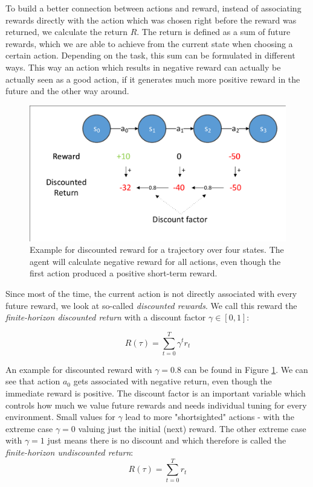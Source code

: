 To build a better connection between actions and reward, instead of associating rewards directly with the action which was chosen right before the reward was returned, we calculate the return $R$. The return is defined as a sum of future rewards, which we are able to achieve from the current state when choosing a certain action. Depending on the task, this sum can be formulated in different ways. This way an action which results in negative reward can actually be actually seen as a good action, if it generates much more positive reward in the future and the other way around.

\begin{figure}[ht]
  
  \begin{center}
      \includegraphics[trim=10px 10px 10px 10px, clip, width=0.75\columnwidth]{figures/rl/discounted_reward.pdf}
  \end{center}
  
  \caption[Discounted Reward Example]{Example for discounted reward for a trajectory over four states. The agent will calculate negative reward for all actions, even though the first action produced a positive short-term reward.}
  \label{fig:DiscountedReward}
\end{figure}

Since most of the time, the current action is not directly associated with every future reward, we look at so-called \textit{discounted rewards}. We call this reward the \textit{finite-horizon discounted return} with a discount factor $\gamma \in [0, 1]$:

\[R(\tau) = \sum_{t=0}^T \gamma^t r_t\]

An example for discounted reward with $\gamma = 0.8$ can be found in Figure \ref{fig:DiscountedReward}. We can see that action $a_0$ gets associated with negative return, even though the immediate reward is positive. The discount factor is an important variable which controls how much we value future rewards and needs individual tuning for every environment. Small values for $\gamma$ lead to more "shortsighted" actions - with the extreme case $\gamma = 0$ valuing just the initial (next) reward. The other extreme case with $\gamma = 1$ just means there is no discount and which therefore is called the \textit{finite-horizon undiscounted return}: 
\[R(\tau) = \sum_{t=0}^T r_t\] 

